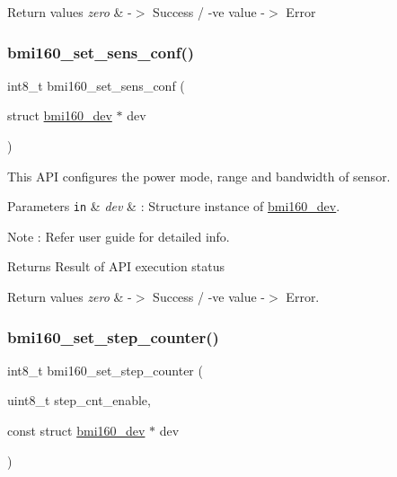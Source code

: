 \begin{DoxyRetVals}{Return values}
{\em zero} & -\/$>$ Success / -\/ve value -\/$>$ Error \\
\hline
\end{DoxyRetVals}
\mbox{\label{group__bmi160_gab098d2c7fda2965b1699ae13d2a8ffc8}} 
\subsubsection{\texorpdfstring{bmi160\+\_\+set\+\_\+sens\+\_\+conf()}{bmi160\_set\_sens\_conf()}}
{\footnotesize\ttfamily int8\+\_\+t bmi160\+\_\+set\+\_\+sens\+\_\+conf (\begin{DoxyParamCaption}\item[{struct \hyperlink{structbmi160__dev}{bmi160\+\_\+dev} $\ast$}]{dev }\end{DoxyParamCaption})}



This A\+PI configures the power mode, range and bandwidth of sensor. 


\begin{DoxyParams}[1]{Parameters}
\mbox{\tt in}  & {\em dev} & \+: Structure instance of \hyperlink{structbmi160__dev}{bmi160\+\_\+dev}. \\
\hline
\end{DoxyParams}
\begin{DoxyNote}{Note}
\+: Refer user guide for detailed info.
\end{DoxyNote}
\begin{DoxyReturn}{Returns}
Result of A\+PI execution status 
\end{DoxyReturn}

\begin{DoxyRetVals}{Return values}
{\em zero} & -\/$>$ Success / -\/ve value -\/$>$ Error. \\
\hline
\end{DoxyRetVals}
\mbox{\label{group__bmi160_ga5a9e71230b2c94b2e609c63def130abf}} 
\subsubsection{\texorpdfstring{bmi160\+\_\+set\+\_\+step\+\_\+counter()}{bmi160\_set\_step\_counter()}}
{\footnotesize\ttfamily int8\+\_\+t bmi160\+\_\+set\+\_\+step\+\_\+counter (\begin{DoxyParamCaption}\item[{uint8\+\_\+t}]{step\+\_\+cnt\+\_\+enable,  }\item[{const struct \hyperlink{structbmi160__dev}{bmi160\+\_\+dev} $\ast$}]{dev }\end{DoxyParamCaption})}



